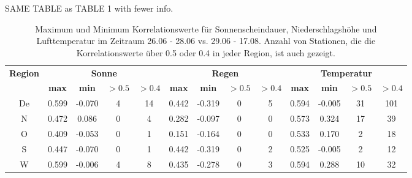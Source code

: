 \documentclass[11pt]{article}
\begin{document}
\begin{landscape}
SAME TABLE as TABLE 1 with fewer info. \\
\begin{table*}
\centering   
\caption{Maximum und Minimum Korrelationswerte f\"ur Sonnenscheindauer, Niederschlagsh\"ohe und Lufttemperatur im Zeitraum 26.06 - 28.06 vs. 29.06 - 17.08. Anzahl von Stationen, die die Korrelationswerte \"uber 0.5 oder 0.4 in jeder Region, ist auch gezeigt. \\} 
\label{tab:}  
\renewcommand{\arraystretch}{1.3}
 \begin{small}
\begin{tabular}{ccccccccccccc}
  \toprule
   \multicolumn{1}{r}{\multirow{2}{1.2cm}{\textbf{Region}}}
 & \multicolumn{4}{c}{\textbf{Sonne}}
& \multicolumn{4}{c}{\textbf{Regen}}
& \multicolumn{4}{c}{\textbf{Temperatur}} \\
\cline{2-13} 
 & \textbf{max} & \textbf{min} & \textbf{$>0.5$} & \textbf{$>0.4$} & \textbf{max} & \textbf{min} & \textbf{$>0.5$} & \textbf{$>0.4$} & \textbf{max} & \textbf{min} & \textbf{$>0.5$} & \textbf{$>0.4$}  \\ 
  \midrule
De & 0.599 & -0.070 & 4 & 14 & 0.442 & -0.319 & 0 & 5 & 0.594 & -0.005 & 31 & 101 \\ 
  N & 0.472 & 0.086 & 0 & 4 & 0.282 & -0.097 & 0 & 0 & 0.573 & 0.324 & 17 & 39   \\ 
  O & 0.409 & -0.053 & 0 & 1 & 0.151 & -0.164 & 0 & 0 & 0.533 & 0.170 & 2 & 18  \\ 
  S & 0.447 & -0.070 & 0 & 1 & 0.442 & -0.319 & 0 & 2 & 0.525 & -0.005 & 2 & 12    \\ 
  W & 0.599 & -0.006 & 4 & 8 & 0.435 & -0.278 & 0 & 3 & 0.594 & 0.288 & 10 & 32\\ 
   \bottomrule
\end{tabular}
\end{small}
\end{table*}
\end{landscape}
\end{document}
